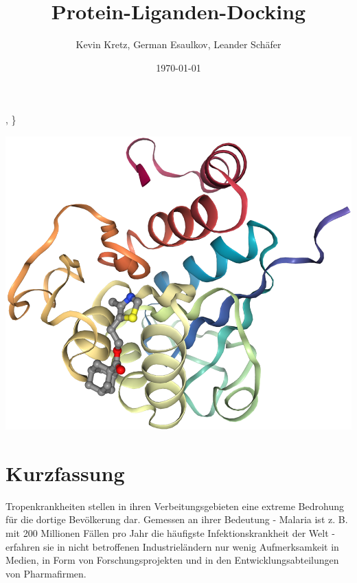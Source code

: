 \documentclass[10pt]{article}
\title{Protein-Liganden-Docking}
\author{Kevin Kretz, German Esaulkov, Leander Schäfer}
\date{\today}
\begin{document}
    {\thecsvrow, \}%


    \maketitle

    \includegraphics[width=\linewidth]{protein-ligand}

    \pagebreak

    \tableofcontents


    \section{Kurzfassung}\label{sec:kurzfassung}



    Tropenkrankheiten stellen in ihren Verbeitungsgebieten eine extreme Bedrohung für die dortige Bevölkerung dar. Gemessen an ihrer Bedeutung - Malaria ist z. B. mit 200 Millionen Fällen pro Jahr die häufigste Infektionskrankheit der Welt  - erfahren sie in nicht betroffenen Industrieländern nur wenig Aufmerksamkeit in Medien, in Form von Forschungsprojekten und in den Entwicklungsabteilungen von Pharmafirmen.

}
\end{document}
